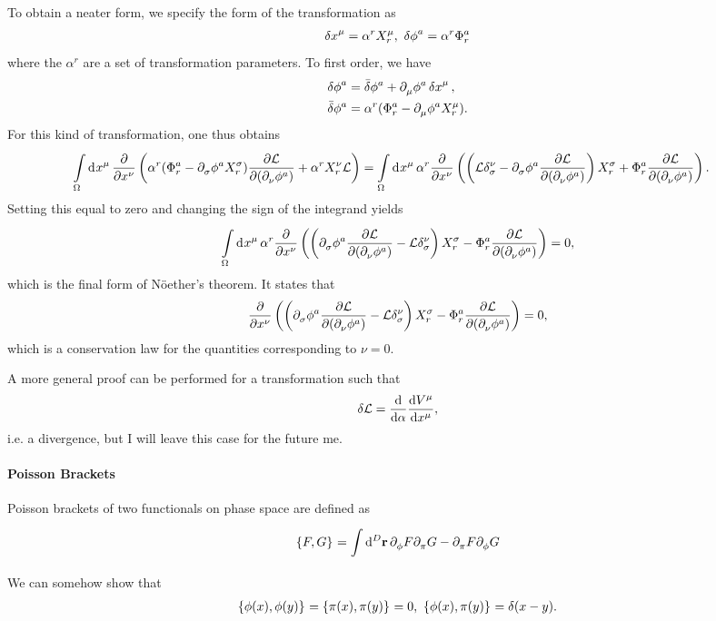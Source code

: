 To obtain a neater form, we specify the form of the transformation as
\begin{align*}
	\var{x}^{\mu} = \alpha^{r}X_{r}^{\mu},\ \var{\phi}^{a} = \alpha^{r}\Phi_{r}^{a}
\end{align*}
where the $\alpha^{r}$ are a set of transformation parameters. To first order, we have
\begin{align*}
	\var{\phi}^{a}  &= \bar{\delta}\phi^{a} + \partial^{}_{\mu}\phi^{a}\var{x}^{\mu}, \\
	\bar{\delta}\phi^{a} &= \alpha^{r}(\Phi_{r}^{a} - \partial^{}_{\mu}\phi^{a}X_{r}^{\mu}).
\end{align*}
For this kind of transformation, one thus obtains
\begin{align*}
	\int\limits_{\Omega}^{}\dd[]{x^{\mu}}\pdv{x^{\nu}}\left(\alpha^{r}(\Phi_{r}^{a} - \partial^{}_{\sigma}\phi^{a}X_{r}^{\sigma})\pdv{\ensuremath{\mathcal{L}}}{(\partial^{}_{\nu}\phi^{a})} + \alpha^{r}X_{r}^{\nu}\mathcal{L}\right) &= \int\limits_{\Omega}^{}\dd[]{x^{\mu}}\alpha^{r}\pdv{x^{\nu}}\left(\left(\mathcal{L}\delta_{\sigma}^{\nu} - \partial^{}_{\sigma}\phi^{a}\pdv{\ensuremath{\mathcal{L}}}{(\partial^{}_{\nu}\phi^{a})}\right)X_{r}^{\sigma} + \Phi_{r}^{a}\pdv{\ensuremath{\mathcal{L}}}{(\partial^{}_{\nu}\phi^{a})}\right).
\end{align*}
Setting this equal to zero and changing the sign of the integrand yields
\begin{align*}
	\int\limits_{\Omega}^{}\dd[]{x^{\mu}}\alpha^{r}\pdv{x^{\nu}}\left(\left(\partial^{}_{\sigma}\phi^{a}\pdv{\ensuremath{\mathcal{L}}}{(\partial^{}_{\nu}\phi^{a})} - \mathcal{L}\delta_{\sigma}^{\nu}\right)X_{r}^{\sigma} - \Phi_{r}^{a}\pdv{\ensuremath{\mathcal{L}}}{(\partial^{}_{\nu}\phi^{a})}\right) = 0,
\end{align*}
which is the final form of Nöether's theorem. It states that
\begin{align*}
	\pdv{x^{\nu}}\left(\left(\partial^{}_{\sigma}\phi^{a}\pdv{\ensuremath{\mathcal{L}}}{(\partial^{}_{\nu}\phi^{a})} - \mathcal{L}\delta_{\sigma}^{\nu}\right)X_{r}^{\sigma} - \Phi_{r}^{a}\pdv{\ensuremath{\mathcal{L}}}{(\partial^{}_{\nu}\phi^{a})}\right) = 0,
\end{align*}
which is a conservation law for the quantities corresponding to $\nu = 0$.

A more general proof can be performed for a transformation such that
\begin{align*}
	\var{\ensuremath{\mathcal{L}}} = \dv{\alpha}\dv{V^{\mu}}{x^{\mu}},
\end{align*}
i.e. a divergence, but I will leave this case for the future me.


\paragraph{Poisson Brackets}
Poisson brackets of two functionals on phase space are defined as
\begin{align*}
	\left\{F, G\right\}_{} = \int\limits_{}^{}\dd[D]{\vb{r}}\partial^{}_{\phi}F\partial^{}_{\pi}G - \partial^{}_{\pi}F\partial^{}_{\phi}G
\end{align*}
We can somehow show that
\begin{align*}
	\pob{\phi(x)}{\phi(y)} = \pob{\pi(x)}{\pi(y)} = 0,\ \pob{\phi(x)}{\pi(y)} = \delta(x - y).
\end{align*}